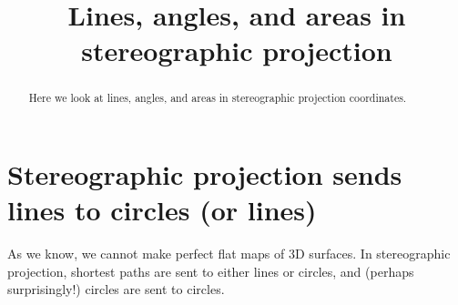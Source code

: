 \documentclass[newpage,hints,handout]{ximera}
\title{Lines, angles, and areas in stereographic projection}
\begin{document}
\begin{abstract}
Here we look at lines, angles, and areas in stereographic projection coordinates.
\end{abstract}
\maketitle


\section{Stereographic projection sends lines to circles (or lines)}

As we know, we cannot make perfect flat maps of 3D surfaces. In stereographic
projection, shortest paths are sent to either lines or circles, and (perhaps
surprisingly!) circles are sent to circles.
\end{document}
